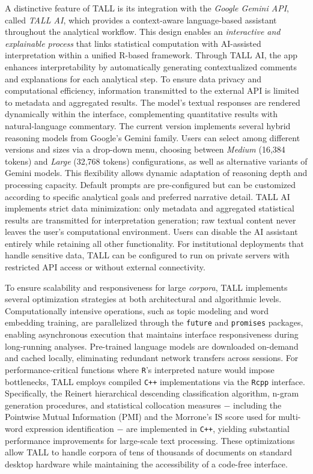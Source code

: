 \documentclass[preprint,12pt,a4paper]{elsarticle}
\begin{document}
A distinctive feature of TALL is its integration with the \textit{Google Gemini API}, called \textit{TALL AI}, which provides a context-aware language-based assistant throughout the analytical workflow. This design enables an \textit{interactive and explainable process} that links statistical computation with AI-assisted interpretation within a unified \textsf{R}-based framework. Through TALL AI, the app enhances interpretability by automatically generating contextualized comments and explanations for each analytical step. To ensure data privacy and computational efficiency, information transmitted to the external API is limited to metadata and aggregated results. The model's textual responses are rendered dynamically within the interface, complementing quantitative results with natural-language commentary. The current version implements several hybrid reasoning models from Google's Gemini family. Users can select among different versions and sizes via a drop-down menu, choosing between \textit{Medium} (16,384 tokens) and \textit{Large} (32,768 tokens) configurations, as well as alternative variants of \textsf{Gemini models}. This flexibility allows dynamic adaptation of reasoning depth and processing capacity. Default prompts are pre-configured but can be customized according to specific analytical goals and preferred narrative detail. TALL AI implements strict data minimization: only metadata and aggregated statistical results are transmitted for interpretation generation; raw textual content never leaves the user's computational environment. Users can disable the AI assistant entirely while retaining all other functionality. For institutional deployments that handle sensitive data, TALL can be configured to run on private servers with restricted API access or without external connectivity.

To ensure scalability and responsiveness for large \textit{corpora}, TALL implements several optimization strategies at both architectural and algorithmic levels. Computationally intensive operations, such as topic modeling and word embedding training, are parallelized through the \texttt{future} \cite{ben21} and \texttt{promises} \cite{che25} packages, enabling asynchronous execution that maintains interface responsiveness during long-running analyses. Pre-trained language models are downloaded on-demand and cached locally, eliminating redundant network transfers across sessions. For performance-critical functions where \texttt{R}'s interpreted nature would impose bottlenecks, TALL employs compiled \texttt{C++} implementations via the \texttt{Rcpp} interface. Specifically, the Reinert hierarchical descending classification algorithm, n-gram generation procedures, and statistical collocation measures $-$ including the Pointwise Mutual Information (PMI) and the Morrone's IS score used for multi-word expression identification $-$ are implemented in \texttt{C++}, yielding substantial performance improvements for large-scale text processing. These optimizations allow TALL to handle corpora of tens of thousands of documents on standard desktop hardware while maintaining the accessibility of a code-free interface.
\end{document}

